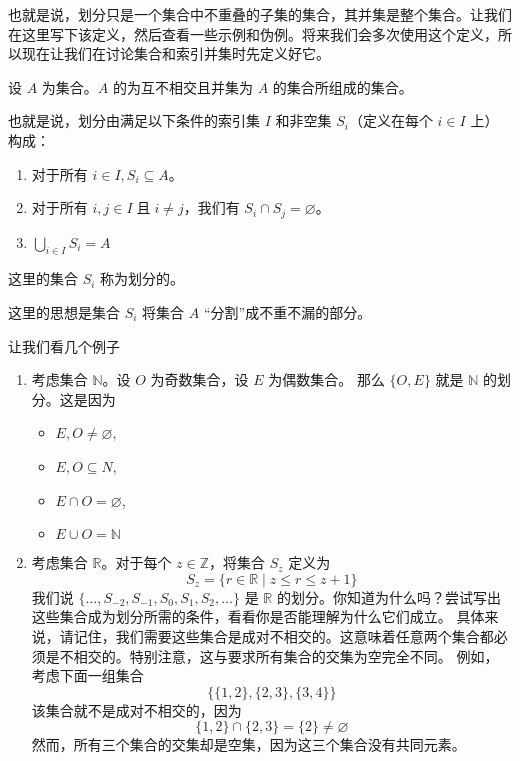也就是说，划分只是一个集合中不重叠的子集的集合，其并集是整个集合。让我们在这里写下该定义，然后查看一些示例和伪例。将来我们会多次使用这个定义，所以现在让我们在讨论集合和索引并集时先定义好它。

\begin{definition}\label{def:definition3.6.9}
    设 $A$ 为集合。$A$ 的为互不相交且并集为 $A$ 的集合所组成的集合。

    也就是说，划分由满足以下条件的索引集 $I$ 和非空集 $S_i$（定义在每个 $i \in I$ 上）构成：
    \begin{enumerate}[label=(\arabic*)]
        \item 对于所有 $i \in I, S_i \subseteq A$。
        \item 对于所有 $i, j \in I \;\text{且}\; i \ne j$，我们有 $S_i \cap S_j = \varnothing$。
        \item $\displaystyle \bigcup_{i \in I} S_i = A$
    \end{enumerate}
    这里的集合 $S_i$ 称为划分的。
\end{definition}

这里的思想是集合 $S_i$ 将集合 $A$ ``分割''成不重不漏的部分。\\

\begin{example}
    让我们看几个例子
    \begin{enumerate}[label=(\arabic*)]
        \item 考虑集合 $\mathbb{N}$。设 $O$ 为奇数集合，设 $E$ 为偶数集合。 那么 $\{O, E\}$ 就是 $\mathbb{N}$ 的划分。这是因为
        \begin{itemize}
            \item $E, O \ne \varnothing$,
            \item $E, O \subseteq N$,
            \item $E \cap O = \varnothing$,
            \item $E \cup O = \mathbb{N}$ 
        \end{itemize}
        \item 考虑集合 $\mathbb{R}$。对于每个 $z \in \mathbb{Z}$，将集合 $S_z$ 定义为
        \[S_z = \{r \in \mathbb{R} \mid z \le r \le z + 1\}\]
        我们说 $\{\dots, S_{-2}, S_{-1}, S_0, S_1, S_2, \dots \}$ 是 $\mathbb{R}$ 的划分。你知道为什么吗？尝试写出这些集合成为划分所需的条件，看看你是否能理解为什么它们成立。
        具体来说，请记住，我们需要这些集合是成对不相交的。这意味着任意两个集合都必须是不相交的。特别注意，这与要求所有集合的交集为空完全不同。
        例如，考虑下面一组集合
        \[\big\{\{1, 2\}, \{2, 3\}, \{3, 4\}\big\}\]
        该集合就不是成对不相交的，因为
        \[\{1, 2\} \cap \{2, 3\} = \{2\} \ne \varnothing\]
        然而，所有三个集合的交集却是空集，因为这三个集合没有共同元素。
    \end{enumerate}
\end{example}

